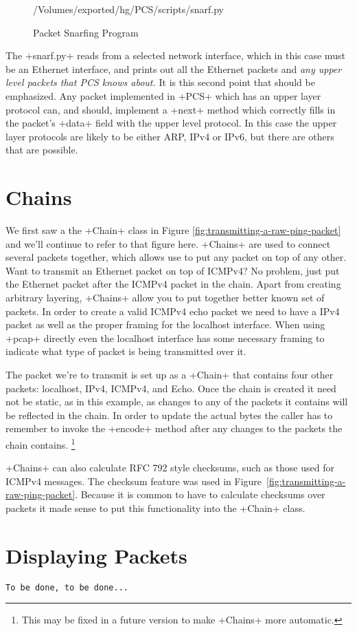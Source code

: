 \documentclass[11pt]{article}
\begin{document}
\begin{figure}
{/Volumes/exported/hg/PCS/scripts/snarf.py}
  \caption{Packet Snarfing Program}
  \label{fig:packet-snarfing-program}
\end{figure}

The \program+snarf.py+ reads from a selected network interface, which
in this case must be an Ethernet interface, and prints out all the
Ethernet packets and \emph{any upper level packets that PCS knows
  about.}  It is this second point that should be emphasized.  Any
packet implemented in \program+PCS+ which has an upper layer protocol
can, and should, implement a \method+next+ method which correctly
fills in the packet's \field+data+ field with the upper level
protocol.  In this case the upper layer protocols are likely to be
either ARP, IPv4 or IPv6, but there are others that are possible.

\section{Chains}
\label{sec:chains}

We first saw a the \class+Chain+ class in Figure
\ref{fig:transmitting-a-raw-ping-packet} and we'll continue to refer
to that figure here.  \class+Chains+ are used to connect several
packets together, which allows use to put any packet on top of any
other.  Want to transmit an Ethernet packet on top of ICMPv4?  No
problem, just put the Ethernet packet after the ICMPv4 packet in the
chain.  Apart from creating arbitrary layering, \class+Chains+ allow
you to put together better known set of packets.  In order to create a
valid ICMPv4 echo packet we need to have a IPv4 packet as well as the
proper framing for the localhost interface.  When using \program+pcap+
directly even the localhost interface has some necessary framing to
indicate what type of packet is being transmitted over it.  

The packet we're to transmit is set up as a \class+Chain+ that
contains four other packets: localhost, IPv4, ICMPv4, and Echo.  Once
the chain is created it need not be static, as in this example, as
changes to any of the packets it contains will be reflected in the
chain.  In order to update the actual bytes the caller has to remember
to invoke the \method+encode+ method after any changes to the packets
the chain contains.  \footnote{This may be fixed in a future version
  to make \class+Chains+ more automatic.}

\class+Chains+ can also calculate RFC 792 style checksums, such as
those used for ICMPv4 messages.  The checksum feature was used in
Figure~\ref{fig:transmitting-a-raw-ping-packet}.  Because it is common
to have to calculate checksums over packets it made sense to put this
functionality into the \class+Chain+ class.

\section{Displaying Packets}
\label{sec:displaying-packets}

\begin{Verbatim}
To be done, to be done...
\end{Verbatim}
\end{document}
